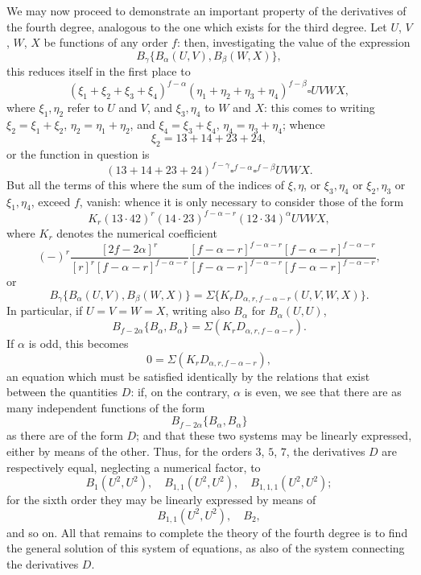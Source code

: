 \documentclass[12pt,a4paper]{article}
\begin{document}
\newpage
\setcounter{page}{109}

We may now proceed to demonstrate an important property of the derivatives of
the fourth degree, analogous to the one which exists for the third degree. Let
$U$, $V$, $W$, $X$ be functions of any order $f$: then, investigating the value of the expression
\[
B_{\gamma}\{B_{\alpha}(U, V), B_{\beta}(W, X)\},
\]
this reduces itself in the first place to
\[
(\xi_1 + \xi_2 + \xi_3 + \xi_4)^{f-\alpha} (\eta_1 + \eta_2 + \eta_3 + \eta_4)^{f-\beta} \square UVWX,
\]
where $\xi_1, \eta_2$ refer to $U$ and $V$, and $\xi_3, \eta_4$ to $W$ and $X$: this comes to writing
$\xi_2 = \xi_1 + \xi_2$, $\eta_2 = \eta_1 + \eta_2$, and $\xi_4 = \xi_3 + \xi_4$, $\eta_4 = \eta_3 + \eta_4$; whence
\[
\xi_2 = 13 + 14 + 23 + 24,
\]
or the function in question is
\[
(13 + 14 + 23 + 24)^{f-\gamma} \square^{f-\alpha} \square^{f-\beta} UVWX.
\]
But all the terms of this where the sum of the indices of $\xi, \eta$, or $\xi_3, \eta_4$ or
$\xi_2, \eta_3$ or $\xi_1, \eta_4$, exceed $f$, vanish: whence it is only necessary to consider those of the
form
\[
K_r (13 \cdot 42)^r (14 \cdot 23)^{f-\alpha-r} (12 \cdot 34)^{\alpha} UVWX,
\]
where $K_r$ denotes the numerical coefficient
\[
(-)^r \frac{[2f-2\alpha]^r}{[r]^r [f-\alpha-r]^{f-\alpha-r}} \frac{[f-\alpha-r]^{f-\alpha-r} [f-\alpha-r]^{f-\alpha-r}}{[f-\alpha-r]^{f-\alpha-r} [f-\alpha-r]^{f-\alpha-r}},
\]
or
\[
B_{\gamma}\{B_{\alpha}(U, V), B_{\beta}(W, X)\}
= \Sigma \{K_r D_{\alpha,r,f-\alpha-r}(U, V, W, X)\}.
\]
In particular, if $U=V=W=X$, writing also $B_{\alpha}$ for $B_{\alpha}(U, U)$,
\[
B_{f-2\alpha}\{B_{\alpha}, B_{\alpha}\} = \Sigma (K_r D_{\alpha,r,f-\alpha-r}).
\]
If $\alpha$ is odd, this becomes
\[
0 = \Sigma (K_r D_{\alpha,r,f-\alpha-r}),
\]
an equation which must be satisfied identically by the relations that exist between
the quantities $D$: if, on the contrary, $\alpha$ is even, we see that there are as many
independent functions of the form
\[
B_{f-2\alpha}\{B_{\alpha}, B_{\alpha}\}
\]
as there are of the form $D$; and that these two systems may be linearly expressed,
either by means of the other. Thus, for the orders $3$, $5$, $7$, the derivatives $D$ are
respectively equal, neglecting a numerical factor, to
\[
B_1(U^2, U^2),\quad B_{1,1}(U^2, U^2),\quad B_{1,1,1}(U^2, U^2);
\]
for the sixth order they may be linearly expressed by means of
\[
B_{1,1}(U^2, U^2),\quad B_2,
\]
and so on. All that remains to complete the theory of the fourth degree is to find
the general solution of this system of equations, as also of the system connecting the
derivatives $D$.
\end{document}
